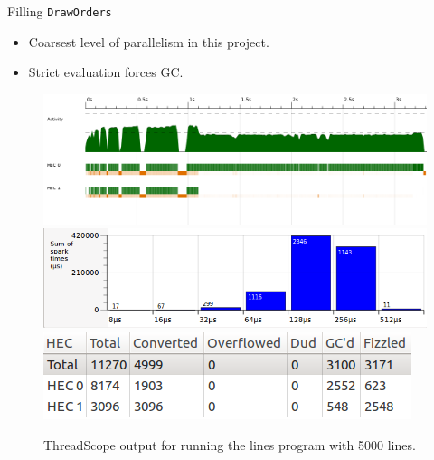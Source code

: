 \documentclass[slidestop,compress,mathserif, xcolor=table]{beamer}
\begin{document}
\begin{frame}[c]{Filling \texttt{DrawOrders}}
  \begin{itemize}
  \item Coarsest level of parallelism in this project.
  \item Strict evaluation forces GC.
  \end{itemize}
 \begin{figure}[h!]
  \centering
  \includegraphics[width=0.7\linewidth,trim={0cm 2cm 0 0},clip]{../threadscope/fillorder/lines}\\
  \includegraphics[width=0.3\linewidth,height=0.15\textheight,trim={0 0 0 0},clip]{../threadscope/fillorder/lines-spark-sizes}
    \includegraphics[width=0.4\linewidth,height=0.15\textheight,trim={0 0 0 0},clip]{../threadscope/fillorder/lines-spark}
  \caption{ThreadScope output for running the lines program with 5000 lines.}
\end{figure}
\end{frame}
\end{document}
